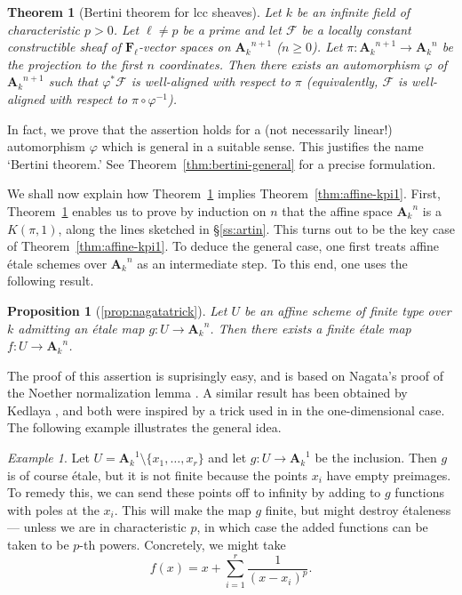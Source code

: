 \documentclass[twoside]{amsart}
\renewcommand{\AA}{\mathbf{A}}
\newcommand{\FF}{\mathbf{F}}
\newcommand{\Ff}{\mathscr{F}}
\newcommand{\ANK}[2]{{\AA_{#2}}^{\! \! \! \!  #1}} %
\newcommand{\AN}[1]{\ANK{#1}{k}}
\renewcommand{\phi}{\varphi}
\renewcommand{\to}{\longrightarrow}
\theoremstyle{plain}
\newtheorem{theorem}[subsubsection]{Theorem}
\newtheorem*{proposition*}{Proposition}
\theoremstyle{definition}
\theoremstyle{remark}
\newtheorem{example}[subsubsection]{Example}
\numberwithin{equation}{subsection}
\begin{document}
\begin{theorem}[Bertini theorem for lcc sheaves] \label{thm:bertini}
	Let $k$ be an infinite field of characteristic $p>0$. Let $\ell \neq p$ be a prime and let $\Ff$ be a locally constant constructible sheaf of $\FF_\ell$-vector spaces on $\AN{n+1}$ ($n\geq 0$). Let $\pi\colon \AN{n+1}\to \AN{n}$ be the projection to the first $n$ coordinates. Then there exists an automorphism $\phi$ of $\AN{n+1}$ such that $\phi^* \Ff$ is well-aligned with respect to $\pi$ (equivalently, $\Ff$ is well-aligned with respect to $\pi\circ \phi^{-1}$). %
\end{theorem}

In fact, we prove that the assertion holds for a (not necessarily linear!) automorphism $\phi$ which is general in a suitable sense. This justifies the name `Bertini theorem.' See Theorem~\ref{thm:bertini-general} for a precise formulation. 

We shall now explain how Theorem~\ref{thm:bertini} implies Theorem~\ref{thm:affine-kpi1}. First, Theorem~\ref{thm:bertini} enables us to prove by induction on $n$ that the affine space $\AN n$ is a $K(\pi, 1)$, along the lines sketched in \S\ref{ss:artin}. This turns out to be the key case of Theorem~\ref{thm:affine-kpi1}. To deduce the general case, one first treats affine \'etale schemes over $\AN n$ as an intermediate step. To this end, one uses the following result.

\begin{proposition*}[\ref{prop:nagatatrick}]
	Let $U$ be an affine scheme of finite type over $k$ admitting an \'etale map $g\colon U\to \AN{n}$. Then there exists a finite \'etale map $f\colon U\to \AN{n}$.
\end{proposition*}

The proof of this assertion is suprisingly easy, and is based on Nagata's proof of the Noether normalization lemma \cite[I \S 1]{Mumford}. A similar result has been obtained by Kedlaya \cite{Kedlaya}, and both were inspired by a trick used in \cite{Katz} in the one-dimensional case. The following example illustrates the general idea.

\begin{example}
 	Let $U = \AN 1 \setminus \{x_1, \ldots, x_r\}$ and let $g\colon U\to \AN 1$ be the inclusion. Then $g$ is of course \'etale, but it is not finite because the points $x_i$ have empty preimages. To remedy this, we can send these points off to infinity by adding to $g$ functions with poles at the $x_i$. This will make the map $g$ finite, but might destroy \'etaleness --- unless we are in characteristic $p$, in which case the added functions can be taken to be $p$-th powers. Concretely, we might take
 	\[ 
 		f(x) = x + \sum_{i=1}^r \frac{1}{(x-x_i)^p}.
 	\]
\end{example} 
\end{document}
